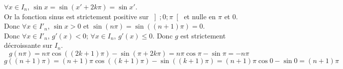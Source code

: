 \documentclass[a4paper,french,bookmarks]{article}
\begin{document}
\begin{enumerate}
\begin{enumerate}
\begin{tcolorbox}[colback=black!3,colframe=black!9,boxrule=.25pt,enhanced,arc is angular,arc=0pt]
    $\forall x \in I_n$, $\sin x = \sin \left(x' + 2k\pi\right) = \sin x'$.\\
        Or la fonction sinus est strictement positive sur $\left]; 0;\pi\right[$ et nulle en $\pi$ et $0$.
    Donc $\forall x \in I'_n$, $\sin x > 0$ et $\sin\left(n\pi\right) = \sin\left(\left(n + 1\right)\pi\right) = 0$.\\
    Donc $\forall x \in I'_n$, $g'\left(x\right) < 0$; $\forall x \in I_n$, $g'\left(x\right) \leq 0$. Donc $g$ est strictement décroissante sur $I_n$.
    \[g(n\pi)=n\pi\cos\left(\left(2k+1\right)\pi\right) - \sin \left(\pi + 2k\pi\right) = n\pi\cos \pi - \sin \pi = -n\pi\] \[g\left(\left(n+1\right)\pi\right) = \left(n+1\right)\pi\cos\left(\left(k+1\right)\pi\right) - \sin\left(\left(k+1\right)\pi\right) = \left(n+1\right)\pi\cos 0 - \sin 0 = \left(n+1\right)\pi\]\\

    \begin{tikzpicture}


\end{tikzpicture}
\end{tcolorbox}
\end{enumerate}
\end{enumerate}
\end{document}
